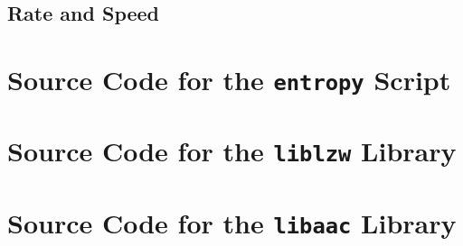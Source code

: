 \documentclass[a4paper, twocolumn]{article}
\begin{document}
        \subsection{Rate and Speed} \label{sec:aac_rate_and_speed}

    \appendix \onecolumn

    \clearpage
    \section{Source Code for the \texttt{entropy} Script} \label{sec:script}

    

    \section{Source Code for the \texttt{liblzw} Library} \label{sec:liblzw}

    
    

    
    

    
    
    
    
    
    
    

    \section{Source Code for the \texttt{libaac} Library} \label{sec:libaac}

    
    

    
    

    
    
    
    
    
    
\end{document}
